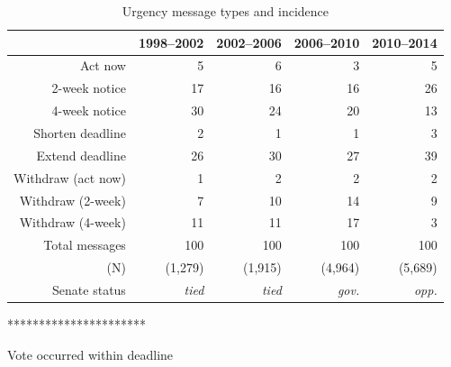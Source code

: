 \documentclass[letter,12pt]{article}
\begin{document}
\begin{table}
\centering
\begin{tabular}{rrrrr}
      & 1998--2002 & 2002--2006 & 2006--2010 & 2010--2014 \\ \hline
 Act now             & 5  & 6  & 3  & 5  \\ 
 2-week notice       & 17 & 16 & 16 & 26 \\ 
 4-week notice       & 30 & 24 & 20 & 13 \\ \hdashline
 Shorten deadline    & 2  & 1  & 1  & 3  \\ 
 Extend deadline     & 26 & 30 & 27 & 39 \\ \hdashline
 Withdraw (act now)  & 1  & 2  & 2  & 2  \\ 
 Withdraw (2-week)   & 7  & 10 & 14 & 9  \\ 
 Withdraw (4-week)   & 11 & 11 & 17 & 3  \\ \hline
 Total messages      & 100 & 100 & 100 & 100 \\ 
(N)                  & (1,279) & (1,915) & (4,964) & (5,689) \\ \hline
 Senate status       & \emph{tied} & \emph{tied} & \emph{gov.} & \emph{opp.} \\
\end{tabular}
\caption{Urgency message types and incidence}
\end{table}


**********************




Vote occurred within deadline
\end{document}
